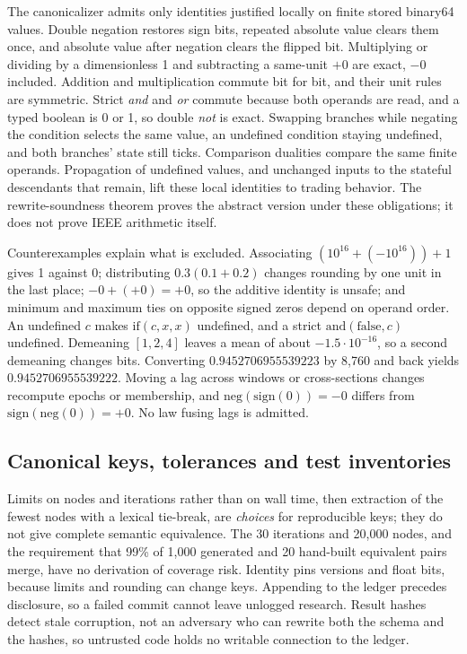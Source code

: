 \documentclass[11pt]{article}
\begin{document}
The canonicalizer admits only identities justified locally on finite stored binary64 values. Double negation restores sign bits, repeated absolute value clears them once, and absolute value after negation clears the flipped bit. Multiplying or dividing by a dimensionless 1 and subtracting a same-unit $+0$ are exact, $-0$ included. Addition and multiplication commute bit for bit, and their unit rules are symmetric. Strict \emph{and} and \emph{or} commute because both operands are read, and a typed boolean is 0 or 1, so double \emph{not} is exact. Swapping branches while negating the condition selects the same value, an undefined condition staying undefined, and both branches' state still ticks. Comparison dualities compare the same finite operands. Propagation of undefined values, and unchanged inputs to the stateful descendants that remain, lift these local identities to trading behavior. The rewrite-soundness theorem proves the abstract version under these obligations; it does not prove IEEE arithmetic itself.

Counterexamples explain what is excluded. Associating $(10^{16}+(-10^{16}))+1$ gives 1 against 0; distributing $0.3(0.1+0.2)$ changes rounding by one unit in the last place; $-0+(+0)=+0$, so the additive identity is unsafe; and minimum and maximum ties on opposite signed zeros depend on operand order. An undefined $c$ makes $\mathrm{if}(c,x,x)$ undefined, and a strict $\mathrm{and}(\mathrm{false},c)$ undefined. Demeaning $[1,2,4]$ leaves a mean of about $-1.5\cdot10^{-16}$, so a second demeaning changes bits. Converting $0.9452706955539223$ by 8{,}760 and back yields $0.9452706955539222$. Moving a lag across windows or cross-sections changes recompute epochs or membership, and $\mathrm{neg}(\mathrm{sign}(0))=-0$ differs from $\mathrm{sign}(\mathrm{neg}(0))=+0$. No law fusing lags is admitted.

\subsection{Canonical keys, tolerances and test inventories}\label{app:kernel-checks}

Limits on nodes and iterations rather than on wall time, then extraction of the fewest nodes with a lexical tie-break, are \emph{choices} for reproducible keys; they do not give complete semantic equivalence. The 30 iterations and 20{,}000 nodes, and the requirement that 99\% of 1{,}000 generated and 20 hand-built equivalent pairs merge, have no derivation of coverage risk. Identity pins versions and float bits, because limits and rounding can change keys. Appending to the ledger precedes disclosure, so a failed commit cannot leave unlogged research. Result hashes detect stale corruption, not an adversary who can rewrite both the schema and the hashes, so untrusted code holds no writable connection to the ledger.
\end{document}
